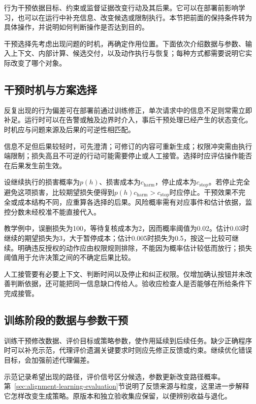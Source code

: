 行为干预依据目标、约束或监督证据改变行动及其后果。它可以在部署前影响学习，也可以在运行中补充信息、改变候选或限制执行。本节把前面的保持条件转为具体操作，并说明如何判断操作是否达到目的。

干预选择先考虑出现问题的时机，再确定作用位置。下面依次介绍数据与参数、输入上下文、内部计算、候选交付，以及动作执行与恢复；每种方式都需要说明它实际改变了哪个对象。

\subsection{干预时机与方案选择}
\label{sec:alignment-intervention-decision}

反复出现的行为偏差可在部署前通过训练修正，单次请求中的信息不足则常需立即补足。运行时可以在告警或触及边界时介入，事后干预处理已经产生的状态变化。时机应与问题来源及后果的可逆性相匹配。

信息不足但后果较轻时，可先澄清；可修订的内容可重新生成；权限冲突需由执行端限制；损失高且不可逆的行动可能需要停止或人工接管。选择时应评估操作能否在后果发生前生效。

设继续执行的损害概率为$p(h)$、损害成本为$c_{\mathrm{harm}}$，停止成本为$c_{\mathrm{stop}}$。若停止完全避免这项损害，比较期望损失便得到$p(h)c_{\mathrm{harm}}>c_{\mathrm{stop}}$时应停止。干预效果不完全或成本结构不同，应重算各选择的后果。风险概率需有对应事件和估计依据，监控分数未经校准不能直接代入。

教学例中，误删损失为100，等待复核成本为2，因而概率阈值为0.02。估计0.03时继续的期望损失为3，大于暂停成本；估计0.005时损失为0.5，按这一比较可继续。明确违反授权的动作应由权限规则排除，不能因为概率估计较低而放行；损失阈值用于允许决策之间的不确定后果比较。

人工接管要有必要上下文、判断时间以及停止和纠正权限。仅增加确认按钮并未改善判断依据，还可能把同一信息缺口传给人。验收应检查人是否能够在所给条件下完成接管。

\subsection{训练阶段的数据与参数干预}
\label{sec:alignment-learning}
\label{sec:alignment-learning-demonstration}
\label{sec:alignment-learning-policy}

训练干预修改数据、评价目标或策略参数，使作用延续到后续任务。缺少正确程序时可以补充示范，代理评价遗漏关键要求时则应先修正反馈或约束。继续优化错误目标，会加强前述代理偏差。

示范记录希望出现的路径，评价信号区分候选，参数更新改变路径概率。第~\ref{sec:alignment-learning-evaluation}节说明了反馈来源与粒度，这里进一步解释它怎样改变生成策略。原版本和独立验收集应保留，以便辨别收益与退化。

